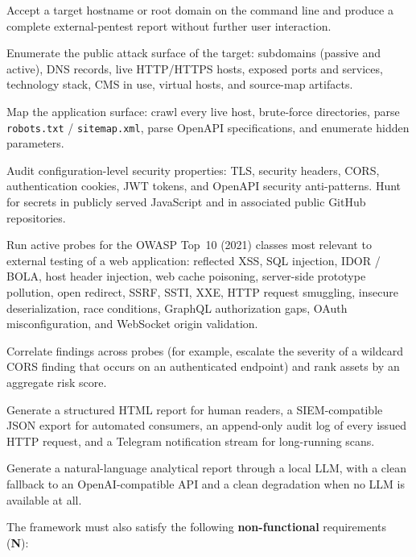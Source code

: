 \begin{description}[style=multiline, leftmargin=1.5cm, labelwidth=1.3cm]
  \item[F1.]  Accept a target hostname or root domain on the command line and produce a complete external-pentest report without further user interaction.
  \item[F2.]  Enumerate the public attack surface of the target: subdomains (passive and active), DNS records, live HTTP/HTTPS hosts, exposed ports and services, technology stack, CMS in use, virtual hosts, and source-map artifacts.
  \item[F3.]  Map the application surface: crawl every live host, brute-force directories, parse \texttt{robots.txt} / \texttt{sitemap.xml}, parse OpenAPI specifications, and enumerate hidden parameters.
  \item[F4.]  Audit configuration-level security properties: TLS, security headers, CORS, authentication cookies, JWT tokens, and OpenAPI security anti-patterns. Hunt for secrets in publicly served JavaScript and in associated public GitHub repositories.
  \item[F5.]  Run active probes for the OWASP Top~10 (2021) classes most relevant to external testing of a web application: reflected XSS, SQL injection, IDOR / BOLA, host header injection, web cache poisoning, server-side prototype pollution, open redirect, SSRF, SSTI, XXE, HTTP request smuggling, insecure deserialization, race conditions, GraphQL authorization gaps, OAuth misconfiguration, and WebSocket origin validation.
  \item[F6.]  Correlate findings across probes (for example, escalate the severity of a wildcard CORS finding that occurs on an authenticated endpoint) and rank assets by an aggregate risk score.
  \item[F7.]  Generate a structured HTML report for human readers, a SIEM-compatible JSON export for automated consumers, an append-only audit log of every issued HTTP request, and a Telegram notification stream for long-running scans.
  \item[F8.]  Generate a natural-language analytical report through a local LLM, with a clean fallback to an OpenAI-compatible API and a clean degradation when no LLM is available at all.
\end{description}

The framework must also satisfy the following \textbf{non-functional} requirements (\textbf{N}):

